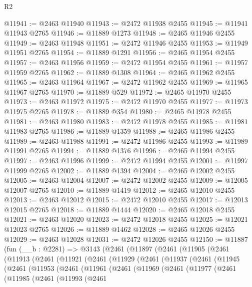 \begin{lexlean}{R2}
\begin{coremodule}
@11941 := @2463 @11940
@11943 := @2472 @11938 @2455
@11945 := @11941 @11943 @2765
@11946 := @11889 @1273
@11948 := @2465 @11946 @2455
@11949 := @2463 @11948
@11951 := @2472 @11946 @2455
@11953 := @11949 @11951 @2765
@11954 := @11889 @1291
@11956 := @2465 @11954 @2455
@11957 := @2463 @11956
@11959 := @2472 @11954 @2455
@11961 := @11957 @11959 @2765
@11962 := @11889 @1308
@11964 := @2465 @11962 @2455
@11965 := @2463 @11964
@11967 := @2472 @11962 @2455
@11969 := @11965 @11967 @2765
@11970 := @11889 @529
@11972 := @2465 @11970 @2455
@11973 := @2463 @11972
@11975 := @2472 @11970 @2455
@11977 := @11973 @11975 @2765
@11978 := @11889 @354
@11980 := @2465 @11978 @2455
@11981 := @2463 @11980
@11983 := @2472 @11978 @2455
@11985 := @11981 @11983 @2765
@11986 := @11889 @1359
@11988 := @2465 @11986 @2455
@11989 := @2463 @11988
@11991 := @2472 @11986 @2455
@11993 := @11989 @11991 @2765
@11994 := @11889 @1376
@11996 := @2465 @11994 @2455
@11997 := @2463 @11996
@11999 := @2472 @11994 @2455
@12001 := @11997 @11999 @2765
@12002 := @11889 @1394
@12004 := @2465 @12002 @2455
@12005 := @2463 @12004
@12007 := @2472 @12002 @2455
@12009 := @12005 @12007 @2765
@12010 := @11889 @1419
@12012 := @2465 @12010 @2455
@12013 := @2463 @12012
@12015 := @2472 @12010 @2455
@12017 := @12013 @12015 @2765
@12018 := @11889 @1444
@12020 := @2465 @12018 @2455
@12021 := @2463 @12020
@12023 := @2472 @12018 @2455
@12025 := @12021 @12023 @2765
@12026 := @11889 @1462
@12028 := @2465 @12026 @2455
@12029 := @2463 @12028
@12031 := @2472 @12026 @2455
@12150 := @11887
    (fun (__b : @2281) =>
    @3143
      (@2461
        (@11897
          (@2461
            (@11905
              (@2461
                (@11913
                  (@2461
                    (@11921
                      (@2461
                        (@11929
                          (@2461
                            (@11937
                              (@2461
                                (@11945
                                  (@2461
                                    (@11953
                                      (@2461
                                        (@11961
                                          (@2461
                                            (@11969
                                              (@2461
                                                (@11977
                                                  (@2461
                                                    (@11985
                                                      (@2461
                                                        (@11993
                                                          (@2461

\end{coremodule}
\end{lexlean}
